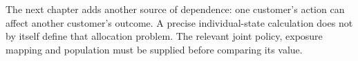 The next chapter adds another source of dependence: one customer's action can
affect another customer's outcome. A precise individual-state calculation does
not by itself define that allocation problem. The relevant joint policy,
exposure mapping and population must be supplied before comparing its value.

